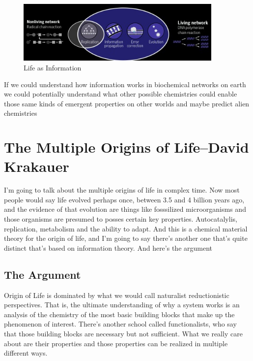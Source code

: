 \documentclass[]{article}
\begin{document}
\begin{figure}[H]
	\caption[Life as Information]{Life as Information\cite{cronin2016beyond}}\label{fig:LifeInformation}
	\includegraphics[width=0.9\textwidth]{LifeInformation}
\end{figure}


If we could understand how information works in biochemical networks on earth we could potentially understand what other 
possible chemistries could enable those
same kinds of emergent properties on
other worlds and maybe predict alien
chemistries

\section[The Multiple Origins of Life]{The Multiple Origins of Life--David Krakauer}

I'm going to talk about the multiple origins of life in complex time. Now most people would say life evolved perhaps once, between 3.5 and 4 billion years ago, and the evidence of that evolution are things like fosssilized microorganisms and those organisms are presumed to posses certain key properties. Autocatalylis, replication, metabolism and the ability to adapt. And this is a chemical material theory for the origin of life, and I'm going to say there's another one that's quite distinct that's based on information theory. And here's the argument

\subsection{The Argument}

Origin of Life is dominated by what we would call naturalist reductionistic perspectives. That is, the ultimate understanding of why a system works is an analysis of the chemistry of the most basic building blocks that make up the phenomenon of interest. There's another school called functionalists, who say that those building blocks are necessary but not sufficient. What we really care about are their properties and those properties can be realized in multiple different ways. 
\end{document}
